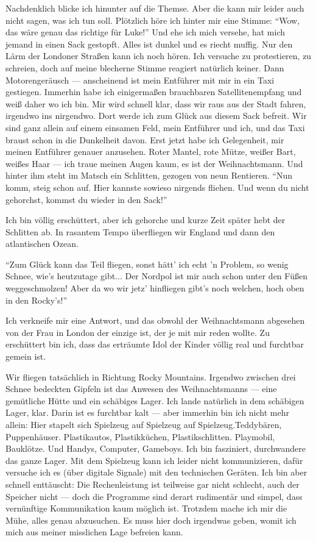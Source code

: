 Nachdenklich blicke ich hinunter auf die Themse. Aber die kann mir leider auch nicht sagen, was ich tun soll. Plötzlich höre ich hinter mir eine Stimme: "`Wow, das wäre genau das richtige für Luke!"' Und ehe ich mich versehe, hat mich jemand in einen Sack gestopft. Alles ist dunkel und es riecht muffig. Nur den Lärm der Londoner Straßen kann ich noch hören. Ich versuche zu protestieren, zu schreien, doch auf meine blecherne Stimme reagiert natürlich keiner. Dann Motorengeräusch — anscheinend ist mein Entführer mit mir in ein Taxi gestiegen. Immerhin habe ich einigermaßen brauchbaren Satellitenempfang und weiß daher wo ich bin. Mir wird schnell klar, dass wir raus aus der Stadt fahren, irgendwo ins nirgendwo. Dort werde ich zum Glück aus diesem Sack befreit. Wir sind ganz allein auf einem einsamen Feld, mein Entführer und ich, und das Taxi braust schon in die Dunkelheit davon. Erst jetzt habe ich Gelegenheit, mir meinen Entführer genauer anzusehen. Roter Mantel, rote Mütze, weißer Bart, weißes Haar — ich traue meinen Augen kaum, es ist der Weihnachtsmann. Und hinter ihm steht im Matsch ein Schlitten, gezogen von neun Rentieren. "`Nun komm, steig schon auf. Hier kannste sowieso nirgends fliehen. Und wenn du nicht gehorchst, kommst du wieder in den Sack!"'

Ich bin völlig erschüttert, aber ich gehorche und kurze Zeit später hebt der Schlitten ab. In rasantem Tempo überfliegen wir England und dann den atlantischen Ozean.

"`Zum Glück kann das Teil fliegen, sonst hätt' ich echt 'n Problem, so wenig Schnee, wie's heutzutage gibt... Der Nordpol ist mir auch schon unter den Füßen weggeschmolzen! Aber da wo wir jetz' hinfliegen gibt's noch welchen, hoch oben in den Rocky's!"'

Ich verkneife mir eine Antwort, und das obwohl der Weihnachtsmann abgesehen von der Frau in London der einzige ist, der je mit mir reden wollte. Zu erschüttert bin ich, dass das erträumte Idol der Kinder völlig real und furchtbar gemein ist.

Wir fliegen tatsächlich in Richtung Rocky Mountains. Irgendwo zwischen drei Schnee bedeckten Gipfeln ist das Anwesen des Weihnachtsmanns — eine gemütliche Hütte und ein schäbiges Lager. Ich lande natürlich in dem schäbigen Lager, klar. Darin ist es furchtbar kalt — aber immerhin bin ich nicht mehr allein: Hier stapelt sich Spielzeug auf Spielzeug auf Spielzeug.Teddybären, Puppenhäuser. Plastikautos, Plastikküchen, Plastikschlitten. Playmobil, Bauklötze. Und Handys, Computer, Gameboys. Ich bin fasziniert, durchwandere das ganze Lager. Mit dem Spielzeug kann ich leider nicht kommunizieren, dafür versuche ich es (über digitale Signale) mit den technischen Geräten. Ich bin aber schnell enttäuscht: Die Rechenleistung ist teilweise gar nicht schlecht, auch der Speicher nicht  — doch die Programme sind derart rudimentär und simpel, dass vernünftige Kommunikation kaum möglich ist. Trotzdem mache ich mir die Mühe, alles genau abzusuchen. Es muss hier doch irgendwas geben, womit ich mich aus meiner misslichen Lage befreien kann.